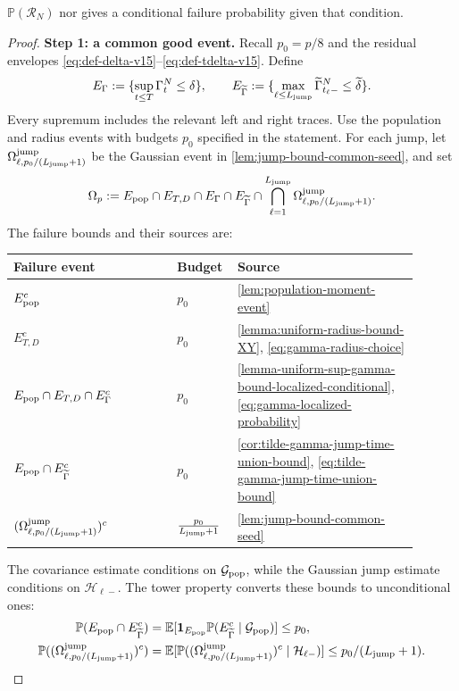 $\mathbb P(\mathcal R_N)$ nor gives a conditional failure probability given
that condition.
\begin{proof}
\noindent\textbf{Step 1: a common good event.}
Recall $p_0=p/8$ and the residual envelopes
\eqref{eq:def-delta-v15}--\eqref{eq:def-tdelta-v15}. Define
\[
 E_\Gamma:=\{\sup_{t\le T}\Gamma_t^N\le\delta\},\qquad
 E_{\widetilde\Gamma}:=
 \{\max_{\ell\le L_{\mathrm{jump}}}\widetilde\Gamma_{t_\ell-}^N\le\widetilde\delta\}.
\]
Every supremum includes the relevant left and right traces. Use the
population and radius events with budgets $p_0$ specified in the statement.
For each jump, let $\Omega_{\ell,p_0/(L_{\mathrm{jump}}+1)}^{\rm jump}$ be the Gaussian
event in \cref{lem:jump-bound-common-seed}, and set
\[
 \Omega_p:=E_{\rm pop}\cap E_{T,D}\cap E_\Gamma\cap E_{\widetilde\Gamma}
       \cap\bigcap_{\ell=1}^{L_{\mathrm{jump}}}
                   \Omega_{\ell,p_0/(L_{\mathrm{jump}}+1)}^{\rm jump}.
\]
The failure bounds and their sources are:
\begin{center}
\begin{tabular}{p{0.38\linewidth}p{0.10\linewidth}p{0.42\linewidth}}
Failure event & Budget & Source\\\hline
$E_{\rm pop}^c$ & $p_0$ & \cref{lem:population-moment-event}\\
$E_{T,D}^c$ & $p_0$ & \cref{lemma:uniform-radius-bound-XY}, \eqref{eq:gamma-radius-choice}\\
$E_{\rm pop}\cap E_{T,D}\cap E_\Gamma^c$ & $p_0$ & \cref{lemma-uniform-sup-gamma-bound-localized-conditional}, \eqref{eq:gamma-localized-probability}\\
$E_{\rm pop}\cap E_{\widetilde\Gamma}^c$ & $p_0$ & \cref{cor:tilde-gamma-jump-time-union-bound}, \eqref{eq:tilde-gamma-jump-time-union-bound}\\
$(\Omega_{\ell,p_0/(L_{\mathrm{jump}}+1)}^{\rm jump})^c$ & $\frac{p_0}{L_{\mathrm{jump}}+1}$ & \cref{lem:jump-bound-common-seed}
\end{tabular}
\end{center}
The covariance estimate conditions on $\mathcal G_{\rm pop}$, while the
Gaussian jump estimate conditions on $\mathcal H_{\ell-}$. The tower
property converts these bounds to unconditional ones:
\[
\begin{aligned}
 \mathbb P(E_{\rm pop}\cap E_{\widetilde\Gamma}^c)
 &=\mathbb E[\mathbf1_{E_{\rm pop}}
      \mathbb P(E_{\widetilde\Gamma}^c\mid\mathcal G_{\rm pop})]\le p_0,\\
 \mathbb P((\Omega_{\ell,p_0/(\NofJ+1)}^{\rm jump})^c)
 &=\mathbb E[\mathbb P((\Omega_{\ell,p_0/(\NofJ+1)}^{\rm jump})^c
      \mid\mathcal H_{\ell-})]\le p_0/(\NofJ+1).

\end{aligned}\]
\end{proof}
